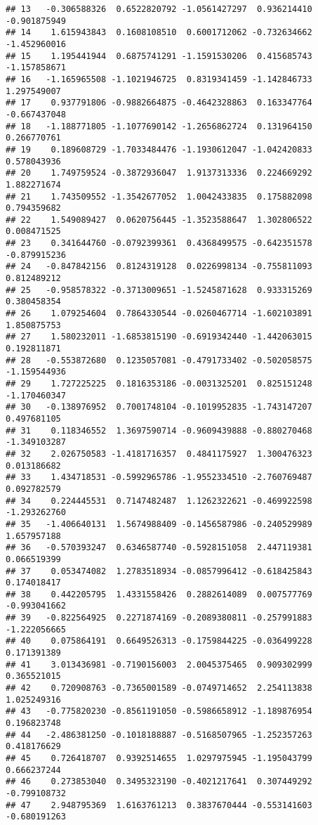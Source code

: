 \documentclass[
]{article}
\begin{document}
\begin{verbatim}
## 13   -0.306588326  0.6522820792 -1.0561427297  0.936214410 -0.901875949
## 14    1.615943843  0.1608108510  0.6001712062 -0.732634662 -1.452960016
## 15    1.195441944  0.6875741291 -1.1591530206  0.415685743 -1.157858671
## 16   -1.165965508 -1.1021946725  0.8319341459 -1.142846733  1.297549007
## 17    0.937791806 -0.9882664875 -0.4642328863  0.163347764 -0.667437048
## 18   -1.188771805 -1.1077690142 -1.2656862724  0.131964150  0.266770761
## 19    0.189608729 -1.7033484476 -1.1930612047 -1.042420833  0.578043936
## 20    1.749759524 -0.3872936047  1.9137313336  0.224669292  1.882271674
## 21    1.743509552 -1.3542677052  1.0042433835  0.175882098  0.794359682
## 22    1.549089427  0.0620756445 -1.3523588647  1.302806522  0.008471525
## 23    0.341644760 -0.0792399361  0.4368499575 -0.642351578 -0.879915236
## 24   -0.847842156  0.8124319128  0.0226998134 -0.755811093  0.812489212
## 25   -0.958578322 -0.3713009651 -1.5245871628  0.933315269  0.380458354
## 26    1.079254604  0.7864330544 -0.0260467714 -1.602103891  1.850875753
## 27    1.580232011 -1.6853815190 -0.6919342440 -1.442063015  0.192811871
## 28   -0.553872680  0.1235057081 -0.4791733402 -0.502058575 -1.159544936
## 29    1.727225225  0.1816353186 -0.0031325201  0.825151248 -1.170460347
## 30   -0.138976952  0.7001748104 -0.1019952835 -1.743147207  0.497681105
## 31    0.118346552  1.3697590714 -0.9609439888 -0.880270468 -1.349103287
## 32    2.026750583 -1.4181716357  0.4841175927  1.300476323  0.013186682
## 33    1.434718531 -0.5992965786 -1.9552334510 -2.760769487  0.092782579
## 34    0.224445531  0.7147482487  1.1262322621 -0.469922598 -1.293262760
## 35   -1.406640131  1.5674988409 -0.1456587986 -0.240529989  1.657957188
## 36   -0.570393247  0.6346587740 -0.5928151058  2.447119381  0.066519399
## 37    0.053474082  1.2783518934 -0.0857996412 -0.618425843  0.174018417
## 38    0.442205795  1.4331558426  0.2882614089  0.007577769 -0.993041662
## 39   -0.822564925  0.2271874169 -0.2089380811 -0.257991883 -1.222056665
## 40    0.075864191  0.6649526313 -0.1759844225 -0.036499228  0.171391389
## 41    3.013436981 -0.7190156003  2.0045375465  0.909302999  0.365521015
## 42    0.720908763 -0.7365001589 -0.0749714652  2.254113838  1.025249316
## 43   -0.775820230 -0.8561191050 -0.5986658912 -1.189876954  0.196823748
## 44   -2.486381250 -0.1018188887 -0.5168507965 -1.252357263  0.418176629
## 45    0.726418707  0.9392514655  1.0297975945 -1.195043799  0.666237244
## 46    0.273853040  0.3495323190 -0.4021217641  0.307449292 -0.799108732
## 47    2.948795369  1.6163761213  0.3837670444 -0.553141603 -0.680191263

\end{verbatim}
\end{document}
